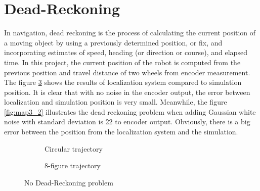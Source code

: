 \documentclass[letterpaper,12pt]{article}
\begin{document}
\section{Dead-Reckoning}
\label{sec:Dead-Reckoning}
\setcounter{figure}{0}  
In navigation, dead reckoning is the process of calculating the current position of a moving object by using a previously determined position, or fix, and incorporating estimates of speed, heading (or direction or course), and elapsed time. In this project, the current position of the robot is computed from the previous position and travel distance of two wheels from encoder measurement. The figure \ref{fig:map3_1} shows the results of localization system compared to simulation position. It is clear that with no noise in the encoder output, the error between localization and simulation position is very small. Meanwhile, the figure \ref{fig:map3_2} illustrates the dead reckoning problem when adding Gaussian white noise with standard deviation is 22 to encoder output. Obviously, there is a big error between the position from the localization system and the simulation. 
\begin{figure}[H]
    \centering
    \begin{subfigure}[b]{8.cm}
        \centering
        \captionsetup{justification=centering}
        \caption{Circular trajectory}
        \label{fig:kermit}
    \end{subfigure}
    \begin{subfigure}[b]{8.cm}
        \centering
        \captionsetup{justification=centering}
        \caption{8-figure trajectory}
        \label{fig:rana}
    \end{subfigure}
\caption{No Dead-Reckoning problem}
\label{fig:map3_1}
\end{figure}
\end{document}
